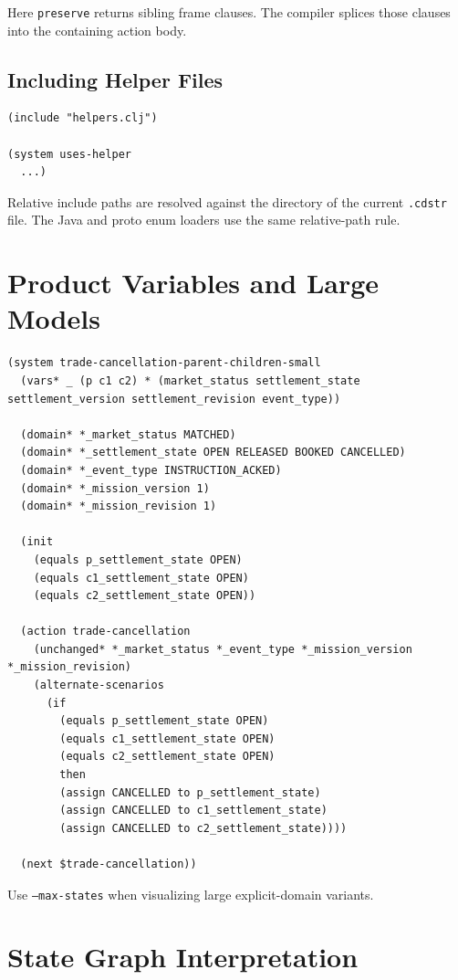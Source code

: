 \documentclass[11pt]{article}
\begin{document}
Here \texttt{preserve} returns sibling frame clauses.  The compiler splices
those clauses into the containing action body.

\subsection{Including Helper Files}

\begin{lstlisting}[language=CDSTR]
(include "helpers.clj")

(system uses-helper
  ...)
\end{lstlisting}

Relative include paths are resolved against the directory of the current
\texttt{.cdstr} file.  The Java and proto enum loaders use the same
relative-path rule.

\section{Product Variables and Large Models}

\begin{lstlisting}[language=CDSTR]
(system trade-cancellation-parent-children-small
  (vars* _ (p c1 c2) * (market_status settlement_state settlement_version settlement_revision event_type))

  (domain* *_market_status MATCHED)
  (domain* *_settlement_state OPEN RELEASED BOOKED CANCELLED)
  (domain* *_event_type INSTRUCTION_ACKED)
  (domain* *_mission_version 1)
  (domain* *_mission_revision 1)

  (init
    (equals p_settlement_state OPEN)
    (equals c1_settlement_state OPEN)
    (equals c2_settlement_state OPEN))

  (action trade-cancellation
    (unchanged* *_market_status *_event_type *_mission_version *_mission_revision)
    (alternate-scenarios
      (if
        (equals p_settlement_state OPEN)
        (equals c1_settlement_state OPEN)
        (equals c2_settlement_state OPEN)
        then
        (assign CANCELLED to p_settlement_state)
        (assign CANCELLED to c1_settlement_state)
        (assign CANCELLED to c2_settlement_state))))

  (next $trade-cancellation))
\end{lstlisting}

Use \texttt{--max-states} when visualizing large explicit-domain variants.

\section{State Graph Interpretation}
\end{document}
